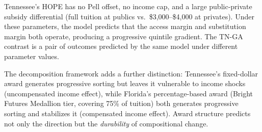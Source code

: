 Tennessee's HOPE has no Pell offset, no income cap, and a large
public-private subsidy differential (full tuition at publics vs.\
\$3,000--\$4,000 at privates). Under these parameters, the model
predicts that the access margin and substitution margin both operate,
producing a progressive quintile gradient. The TN-GA contrast is
a pair of outcomes predicted by the same model under different
parameter values.

The decomposition framework adds a further distinction: Tennessee's
fixed-dollar award generates progressive sorting but leaves it
vulnerable to income shocks (uncompensated income effect), while
Florida's percentage-based award (Bright Futures Medallion tier,
covering 75\% of tuition) both generates progressive sorting and
stabilizes it (compensated income effect). Award structure predicts
not only the direction but the \emph{durability} of compositional
change.
